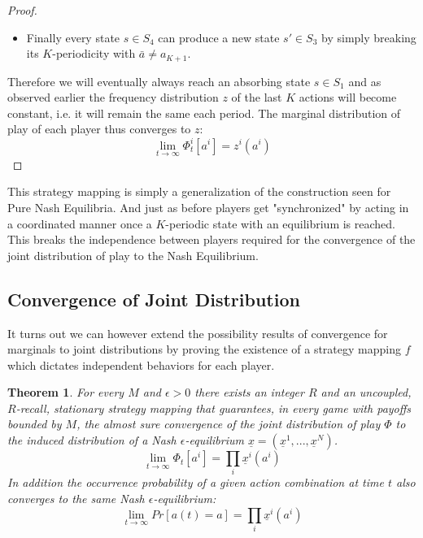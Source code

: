\documentclass[a4paper]{article}
\theoremstyle{plain}
\newtheorem{theorem}{Theorem}
\theoremstyle{remark}
\newtheorem{remark}{Remark}
\newcommand{\eq}[1]{\underline{#1}}
\begin{document}
\begin{proof}
\begin{description}
\begin{itemize}
			\item Finally every state $s \in S_4$ can produce a new state $s' \in S_3$ by simply breaking its $K$-periodicity with
			$\bar{a} \neq a_{K+1}$.
		\end{itemize}
	\end{description}
	Therefore we will eventually always reach an absorbing state $s \in S_1$ and as observed earlier the frequency distribution
	$z$ of the last $K$ actions will become constant, i.e. it will remain the same each period.
	The marginal distribution of play of each player thus converges to $z$:
	\[
		\lim_{t \to \infty} \Phi_t^i[a^i] = z^i(a^i)
	\]
\end{proof}


This strategy mapping is simply a generalization of the construction seen for Pure Nash Equilibria.
And just as before players get "synchronized" by acting in a coordinated manner once a $K$-periodic state
with an equilibrium is reached. This breaks the independence between players required for the convergence
of the joint distribution of play to the Nash Equilibrium.

\subsection{Convergence of Joint Distribution}

It turns out we can however extend the possibility results of convergence for marginals to joint distributions
by proving the existence of a strategy mapping $f$ which dictates independent behaviors for each player.

\begin{theorem}
	For every $M$ and $\epsilon > 0$ there exists an integer $R$ and an uncoupled, $R$-recall,
	stationary strategy mapping that guarantees, in every game with payoffs bounded by $M$, the
	almost sure convergence of the joint distribution of play $\Phi$ to the induced distribution of
	a Nash $\epsilon$-equilibrium $\eq{x} = (\eq{x}^1, ..., \eq{x}^N)$.
	\[
		\lim_{t \to \infty} \Phi_t[a^i] = \prod_i \eq{x}^i(a^i)
	\]
	In addition the occurrence probability of a given action combination at time $t$ also converges to
	the same Nash $\epsilon$-equilibrium:
	\[
		\lim_{t \to \infty} Pr[a(t) = a] = \prod_i \eq{x}^i(a^i)
	\]
\end{theorem}
\end{document}
